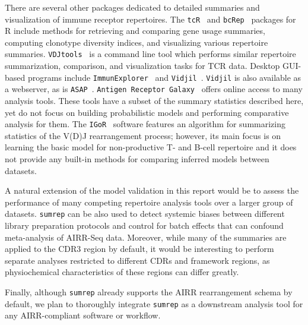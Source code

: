 \documentclass{article}
\newcommand{\igor}{\texttt{IGoR}}
\begin{document}
There are several other packages dedicated to detailed summaries and visualization of immune receptor repertoires.
The \texttt{tcR}~\cite{Nazarov2015-ok} and \texttt{bcRep}~\cite{Bischof2016-fn} packages for R include methods for retrieving and comparing gene usage summaries, computing clonotype diversity indices, and visualizing various repertoire summaries.
\texttt{VDJtools}~\cite{Shugay2015-ur} is a command line tool which performs similar repertoire summarization, comparison, and visualization tasks for TCR data.
Desktop GUI-based programs include \texttt{ImmunExplorer}~\cite{Schaller2015-sw} and \texttt{Vidjil}~\cite{Duez2016-dt}.
\texttt{Vidjil} is also available as a webserver, as is \texttt{ASAP}~\cite{Avram2018-aw}.
\texttt{Antigen Receptor Galaxy}~\cite{IJspeert2017-iv} offers online access to many analysis tools. 
These tools have a subset of the summary statistics described here, yet do not focus on building probabilistic models and performing comparative analysis for them.
The \igor~\cite{Marcou2018-du} software features an algorithm for summarizing statistics of the V(D)J rearrangement process; however, its main focus is on learning the basic model for non-productive T- and B-cell repertoire and it does not provide any built-in methods for comparing inferred models between datasets.


A natural extension of the model validation in this report would be to assess the performance of many competing repertoire analysis tools over a larger group of datasets.
\texttt{sumrep} can be also used to detect systemic biases between different library preparation protocols and control for batch effects that can confound meta-analysis of AIRR-Seq data.
Moreover, while many of the summaries are applied to the CDR3 region by default, it would be interesting to perform separate analyses restricted to different CDRs and framework regions, as physiochemical characteristics of these regions can differ greatly.

Finally, although \texttt{sumrep} already supports the AIRR rearrangement schema by default, we plan to thoroughly integrate \texttt{sumrep} as a downstream analysis tool for any AIRR-compliant software or workflow.
\end{document}
